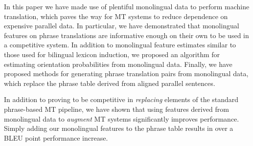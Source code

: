 \documentclass[11pt]{article}
\newcommand{\secref}[1]{Section~\ref{#1}}
\begin{document}
In this paper we have made use of plentiful monolingual data to perform machine translation, which paves the way for MT systems to reduce dependence on expensive parallel data.  In particular, we have demonstrated that monolingual features on phrase translations are informative enough on their own to be used in a competitive system. In addition to monolingual feature estimates similar to those used for bilingual lexicon induction, we proposed an algorithm for estimating orientation probabilities from monolingual data. Finally, we have proposed methods for generating phrase translation pairs from monolingual data, which replace the phrase table derived from aligned parallel sentences.

In addition to proving to be competitive in {\it replacing} elements of the standard phrase-based MT pipeline, we have shown that using features derived from monolingual data to {\it augment} MT systems significantly improves performance. Simply adding our monolingual features to the phrase table results in over a BLEU point performance increase.




\newpage


\end{document}
